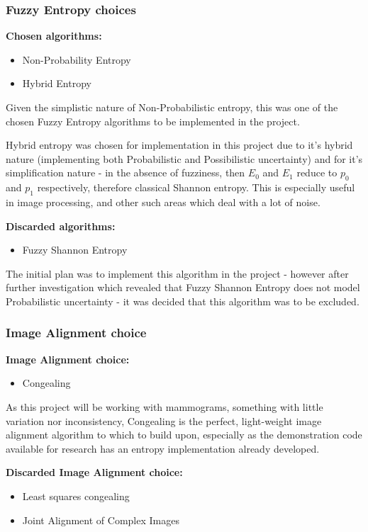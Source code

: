 \subsubsection{Fuzzy Entropy choices}

\textbf{Chosen algorithms:}
\begin{itemize}
  \item Non-Probability Entropy
  \item Hybrid Entropy
\end{itemize}

Given the simplistic nature of Non-Probabilistic entropy, this was one of the chosen Fuzzy Entropy algorithms to be implemented in the project.

Hybrid entropy was chosen for implementation in this project due to it's hybrid nature (implementing both Probabilistic and Possibilistic uncertainty) and for it's simplification nature - in the absence of fuzziness, then $E_0$ and $E_1$ reduce to $p_0$ and $p_1$ respectively, therefore classical Shannon entropy. This is especially useful in image processing, and other such areas which deal with a lot of noise.

\textbf{Discarded algorithms:}
\begin{itemize}
  \item Fuzzy Shannon Entropy
\end{itemize}

The initial plan was to implement this algorithm in the project - however after further investigation which revealed that Fuzzy Shannon Entropy does not model Probabilistic uncertainty - it was decided that this algorithm was to be excluded.

\subsubsection{Image Alignment choice}

\textbf{Image Alignment choice:}
\begin{itemize}
    \item Congealing
\end{itemize}

As this project will be working with mammograms, something with little variation nor inconsistency, Congealing is the perfect, light-weight image alignment algorithm to which to build upon, especially as the demonstration code available for research has an entropy implementation already developed.

\textbf{Discarded Image Alignment choice:}
\begin{itemize}
    \item Least squares congealing
    \item Joint Alignment of Complex Images
\end{itemize}

